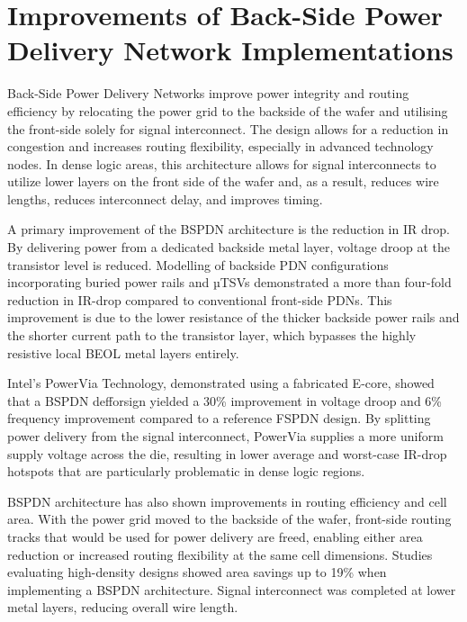 \section{Improvements of Back-Side Power Delivery Network Implementations}

Back-Side Power Delivery Networks improve power integrity and routing efficiency by relocating the power grid to the backside of the wafer and utilising the front-side solely for signal interconnect. The design allows for a reduction in congestion and increases routing flexibility, especially in advanced technology nodes\cite{10631463}. In dense logic areas, this architecture allows for signal interconnects to utilize lower layers on the front side of the wafer and, as a result, reduces wire lengths, reduces interconnect delay, and improves timing\cite{11192533}.

A primary improvement of the BSPDN architecture is the reduction in IR drop. By delivering power from a dedicated backside metal layer, voltage droop at the transistor level is reduced. Modelling of backside PDN configurations incorporating buried power rails and µTSVs demonstrated a more than four-fold reduction in IR-drop compared to conventional front-side PDNs\cite{8932458}. This improvement is due to the lower resistance of the thicker backside power rails and the shorter current path to the transistor layer, which bypasses the highly resistive local BEOL metal layers entirely.

Intel's PowerVia Technology, demonstrated using a fabricated E-core, showed that a BSPDN defforsign yielded a 30\% improvement in voltage droop and 6\% frequency improvement compared to a reference FSPDN design\cite{10185208}. By splitting power delivery from the signal interconnect, PowerVia supplies a more uniform supply voltage across the die, resulting in lower average and worst-case IR-drop hotspots that are particularly problematic in dense logic regions\cite{10185208}.

BSPDN architecture has also shown improvements in routing efficiency and cell area. With the power grid moved to the backside of the wafer, front-side routing tracks that would be used for power delivery are freed, enabling either area reduction or increased routing flexibility at the same cell dimensions. Studies evaluating high-density designs showed area savings up to 19\% when implementing a BSPDN architecture. Signal interconnect was completed at lower metal layers, reducing overall wire length\cite{10631463}.

